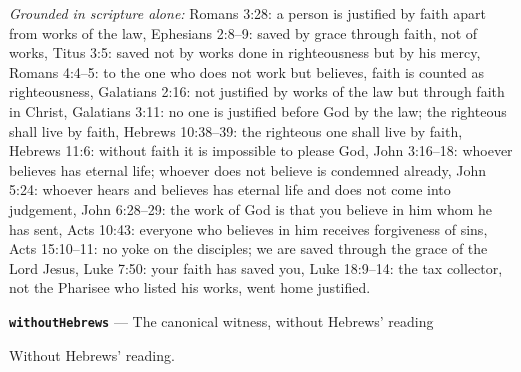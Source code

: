 \documentclass[11pt,paper=\testimonypaper,DIV=13,parskip=false]{scrartcl}
\begin{document}
\emph{Grounded in scripture alone:} Romans 3:28: a person is justified by faith apart from works of the law, Ephesians 2:8–9: saved by grace through faith, not of works, Titus 3:5: saved not by works done in righteousness but by his mercy, Romans 4:4–5: to the one who does not work but believes, faith is counted as righteousness, Galatians 2:16: not justified by works of the law but through faith in Christ, Galatians 3:11: no one is justified before God by the law; the righteous shall live by faith, Hebrews 10:38–39: the righteous one shall live by faith, Hebrews 11:6: without faith it is impossible to please God, John 3:16–18: whoever believes has eternal life; whoever does not believe is condemned already, John 5:24: whoever hears and believes has eternal life and does not come into judgement, John 6:28–29: the work of God is that you believe in him whom he has sent, Acts 10:43: everyone who believes in him receives forgiveness of sins, Acts 15:10–11: no yoke on the disciples; we are saved through the grace of the Lord Jesus, Luke 7:50: your faith has saved you, Luke 18:9–14: the tax collector, not the Pharisee who listed his works, went home justified.
\par\medskip\noindent\textbf{\texttt{without\allowbreak{}Hebrews}} --- The canonical witness, without Hebrews’ reading\par\nobreak\noindent
Without Hebrews’ reading.
\end{document}
